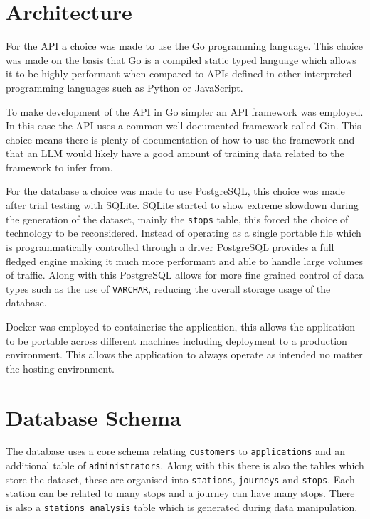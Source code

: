 \documentclass[10pt,a4paper]{article}
\begin{document}
\section{Architecture}

For the API a choice was made to use the Go programming language. This choice was made on the basis that Go is a compiled static typed language which allows it to be highly performant when compared to APIs defined in other interpreted programming languages such as Python or JavaScript.

\noindent
\newline
To make development of the API in Go simpler an API framework was employed. In this case the API uses a common well documented framework called Gin. This choice means there is plenty of documentation of how to use the framework and that an LLM would likely have a good amount of training data related to the framework to infer from.

\noindent
\newline
For the database a choice was made to use PostgreSQL, this choice was made after trial testing with SQLite. SQLite started to show extreme slowdown during the generation of the dataset, mainly the \texttt{stops} table, this forced the choice of technology to be reconsidered. Instead of operating as a single portable file which is programmatically controlled through a driver PostgreSQL provides a full fledged engine making it much more performant and able to handle large volumes of traffic. Along with this PostgreSQL allows for more fine grained control of data types such as the use of \texttt{VARCHAR}, reducing the overall storage usage of the database.

\noindent
\newline
Docker was employed to containerise the application, this allows the application to be portable across different machines including deployment to a production environment. This allows the application to always operate as intended no matter the hosting environment.

\section{Database Schema}

The database uses a core schema relating \texttt{customers} to \texttt{applications} and an additional table of \texttt{administrators}. Along with this there is also the tables which store the dataset, these are organised into \texttt{stations}, \texttt{journeys} and \texttt{stops}. Each station can be related to many stops and a journey can have many stops. There is also a \texttt{stations\_analysis} table which is generated during data manipulation.
\end{document}
